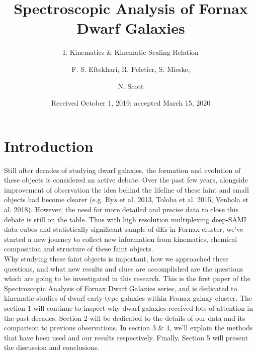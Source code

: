 \documentclass{aa}
\begin{document}
 


   \title{Spectroscopic Analysis of Fornax Dwarf Galaxies}

   \subtitle{I. Kinematics \& Kinematic Scaling Relation}

   \author{F. S. Eftekhari, R. Peletier, S. Mieske, \and N. Scott }


   \date{Received October 1, 2019; accepted March 15, 2020}

 
  \abstract
   {\bigskip}
   {\bigskip}
   {\bigskip}
   {\bigskip}
   {}

   \keywords{\bigskip}

   \maketitle
%

\section{Introduction}

   Still after decades of studying dwarf galaxies, the formation and evolution of these objects is considered an active debate. Over the past few years, alongside improvement of observation the idea behind the lifeline of these faint and small objects had become clearer (e.g. Ry$\acute{s}$ et al. 2013, Toloba et al. 2015, Venhola et al. 2018). However, the need for more detailed and precise data to close this debate is still on the table. Thus with high resolution multiplexing deep-SAMI data cubes and statistically significant sample of dEs in Fornax cluster, we've started a new journey to collect new information from kinematics, chemical composition and structure of these faint objects. \\Why studying these faint objects is important, how we approached these questions, and what new results and clues are accomplished are the questions which are going to be investigated in this research. This is the first paper of the Spectroscopic Analysis of Fornax Dwarf Galaxies series, and is dedicated to kinematic studies of dwarf early-type galaxies within Fronax galaxy cluster. The section 1 will continue to inspect why dwarf galaxies received lots of attention in the past decades. Section 2 will be dedicated to the details of our data and its comparison to previous observations. In section 3 \& 4, we'll explain the methods that have been used and our results respectively. Finally, Section 5 will present the discussion and conclusions.   
\end{document}
